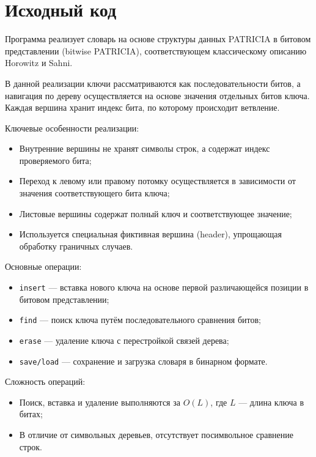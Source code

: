 \section{Исходный код}

Программа реализует словарь на основе структуры данных PATRICIA в битовом представлении 
(bitwise PATRICIA), соответствующем классическому описанию Horowitz и Sahni.

В данной реализации ключи рассматриваются как последовательности битов, а навигация по дереву 
осуществляется на основе значения отдельных битов ключа. Каждая вершина хранит индекс бита, 
по которому происходит ветвление.

Ключевые особенности реализации:
\begin{itemize}
    \item Внутренние вершины не хранят символы строк, а содержат индекс проверяемого бита;
    
    \item Переход к левому или правому потомку осуществляется в зависимости от значения 
    соответствующего бита ключа;
    
    \item Листовые вершины содержат полный ключ и соответствующее значение;
    
    \item Используется специальная фиктивная вершина (header), упрощающая обработку граничных случаев.
\end{itemize}

Основные операции:
\begin{itemize}
    \item \texttt{insert} — вставка нового ключа на основе первой различающейся позиции в битовом представлении;
    \item \texttt{find} — поиск ключа путём последовательного сравнения битов;
    \item \texttt{erase} — удаление ключа с перестройкой связей дерева;
    \item \texttt{save/load} — сохранение и загрузка словаря в бинарном формате.
\end{itemize}

Сложность операций:
\begin{itemize}
    \item Поиск, вставка и удаление выполняются за $O(L)$, где $L$ — длина ключа в битах;
    \item В отличие от символьных деревьев, отсутствует посимвольное сравнение строк.
\end{itemize}

